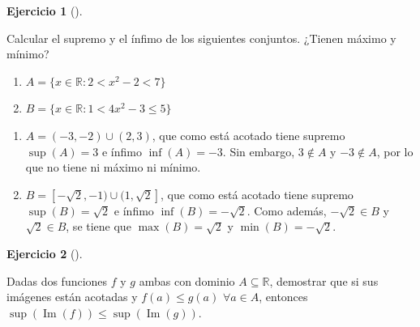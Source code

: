 \documentclass[
  spanish,
  a4paper,
]{scrreport}
\providecommand{\tightlist}{%
  \setlength{\itemsep}{0pt}\setlength{\parskip}{0pt}}
\theoremstyle{definition}
\newtheorem{exercise}{Ejercicio}[chapter]
\theoremstyle{remark}
\begin{document}
\begin{exercise}[]\protect\hypertarget{exr-supremo-infimo-maximo-minimo-2}{}\label{exr-supremo-infimo-maximo-minimo-2}

Calcular el supremo y el ínfimo de los siguientes conjuntos. ¿Tienen
máximo y mínimo?

\begin{enumerate}
\def\labelenumi{\alph{enumi}.}
\tightlist
\item
  \(A=\{x\in \mathbb{R} : 2 < x^2-2 < 7\}\)
\item
  \(B=\{x\in \mathbb{R} : 1 < 4x^2 - 3 \leq 5\}\)
\end{enumerate}

\end{exercise}

\begin{tcolorbox}[enhanced jigsaw, arc=.35mm, bottomrule=.15mm, bottomtitle=1mm, breakable, colback=white, colbacktitle=quarto-callout-tip-color!10!white, colframe=quarto-callout-tip-color-frame, coltitle=black, left=2mm, leftrule=.75mm, opacityback=0, opacitybacktitle=0.6, rightrule=.15mm, title=\textcolor{quarto-callout-tip-color}{\faLightbulb}\hspace{0.5em}{Solución}, titlerule=0mm, toprule=.15mm, toptitle=1mm]

\begin{enumerate}
\def\labelenumi{\alph{enumi}.}
\item
  \(A=(-3,-2)\cup(2,3)\), que como está acotado tiene supremo
  \(\sup(A)=3\) e ínfimo \(\inf(A)=-3\). Sin embargo, \(3\not \in A\) y
  \(-3\not\in A\), por lo que no tiene ni máximo ni mínimo.
\item
  \(B=[-\sqrt{2},-1)\cup(1,\sqrt{2}]\), que como está acotado tiene
  supremo \(\sup(B)=\sqrt{2}\) e ínfimo \(\inf(B)=-\sqrt{2}\). Como
  además, \(-\sqrt{2} \in B\) y \(\sqrt{2}\in B\), se tiene que
  \(\max(B)=\sqrt{2}\) y \(\min(B)=-\sqrt{2}\).
\end{enumerate}

\end{tcolorbox}

\begin{exercise}[]\protect\hypertarget{exr-supremo-funciones}{}\label{exr-supremo-funciones}

Dadas dos funciones \(f\) y \(g\) ambas con dominio
\(A\subseteq \mathbb{R}\), demostrar que si sus imágenes están acotadas
y \(f(a)\leq g(a)\) \(\forall a\in A\), entonces
\(\sup(\operatorname{Im}(f))\leq \sup(\operatorname{Im}(g))\).

\end{exercise}
\end{document}
